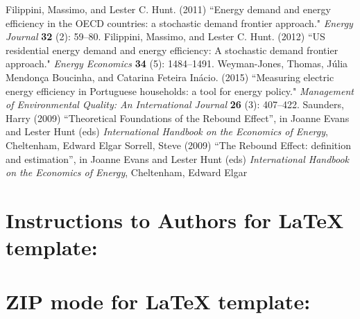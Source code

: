 \documentclass[3p,times,procedia]{elsarticle}
\begin{document}
%
%




 \begin{thebibliography}{}


{F}ilippini, Massimo, and Lester C. Hunt. (2011) ``Energy demand and
energy efficiency in the OECD countries: a stochastic demand frontier
approach." {\it Energy Journal} {\bf 32} (2): 59--80.
Filippini, Massimo, and Lester C. Hunt. (2012) ``US residential
energy demand and energy efficiency: A stochastic demand frontier
approach." {\it Energy Economics} {\bf 34} (5): 1484--1491.
Weyman-Jones, Thomas, J\'{u}lia Mendon\c{c}a Boucinha, and Catarina
Feteira In\'{a}cio. (2015) ``Measuring electric energy efficiency in
Portuguese households: a tool for energy policy." {\it Management of Environmental Quality: An International Journal} {\bf 26} (3): 407--422.
\bibitem{} 
Saunders, Harry (2009) ``Theoretical Foundations of the Rebound Effect'', in Joanne Evans and Lester Hunt (eds) {\it International Handbook on the Economics of Energy}, Cheltenham, Edward Elgar
\bibitem{} 
Sorrell, Steve (2009) ``The Rebound Effect: definition and estimation'', in Joanne Evans and Lester Hunt (eds) {\it International Handbook on the Economics of Energy}, Cheltenham, Edward Elgar 
 \end{thebibliography}

\clearpage

\normalMode

\section*{Instructions to Authors for LaTeX template:}

\section{ZIP mode for LaTeX template:}
\end{document}
